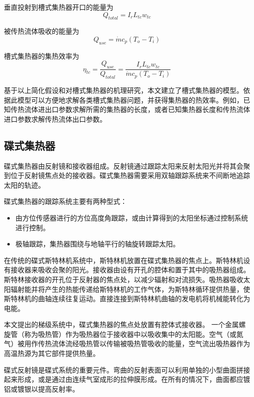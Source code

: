 垂直投射到槽式集热器开口的能量为
\begin{equation}
  Q_{total} = I_r L_{tc} w_{tc}
\end{equation}

被传热流体吸收的能量为
\begin{equation}
  Q_{use} = \dot{m}c_p(T_o - T_i)
\end{equation}

槽式集热器的集热效率为
\begin{equation}
  \eta_{tc} = \dfrac{Q_{use}}{Q_{total}} = 
  \dfrac{I_r L_{tc} w_{tc}}{\dot{m}c_p(T_o - T_i)}
  \label{eq:eta_tc}
\end{equation}

基于以上简化假设和对槽式集热器的机理研究，本文建立了槽式集热器的模型。依据此模型可以方便地求解各类槽式集热器问题，并获得集热器的热效率。例如，已知传热流体进出口参数求解所需的集热器的长度，或者已知集热器长度和传热流体进口参数求解传热流体出口参数。

\subsection{碟式集热器}
\label{sec:pdc}

碟式集热器由反射镜和接收器组成。反射镜通过跟踪太阳来反射太阳光并将其会聚到位于反射镜焦点处的接收器。碟式集热器需要采用双轴跟踪系统来不间断地追踪太阳的轨迹。

碟式集热器的跟踪系统主要有两种型式\cite{Adkins1987}：
\begin{itemize}
  \item 由方位传感器进行的方位高度角跟踪，或由计算得到的太阳坐标通过控制系统进行控制。
  \item 极轴跟踪，集热器围绕与地轴平行的轴旋转跟踪太阳。
\end{itemize}

在传统的碟式斯特林机系统中，斯特林机放置在碟式集热器的焦点上。斯特林机设有接收器来吸收会聚的阳光。接收器由设有开孔的腔体和置于其中的吸热器组成。斯特林接收器的开孔位于反射器的焦点处，以减少辐射和对流损失。吸热器吸收太阳辐射能并将产生的热能传递给斯特林机的工作气体，为斯特林循环提供热量，使斯特林机的曲轴连续往复运动。直接连接到斯特林机曲轴的发电机将机械能转化为电能。

本文提出的梯级系统中，碟式集热器的焦点处放置有腔体式接收器。 一个金属螺旋管（称为吸热管）作为吸热器位于接收器中以吸收集中的太阳能。空气（或氮气）被用作传热流体流经吸热管以传输被吸热管吸收的能量，空气流出吸热器作为高温热源为其它部件提供热量。

碟式反射镜是碟式系统的重要元件。弯曲的反射表面可以利用单独的小型曲面拼接起来形成，或是通过由连续气室成形的拉伸膜形成。在所有的情况下，曲面都应镀铝或镀银以提高反射率。

